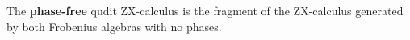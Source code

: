 \begin{definition}
The {\bf phase-free} qudit ZX-calculus
is the fragment of the ZX-calculus generated by both Frobenius algebras with no phases.
%
\end{definition}


